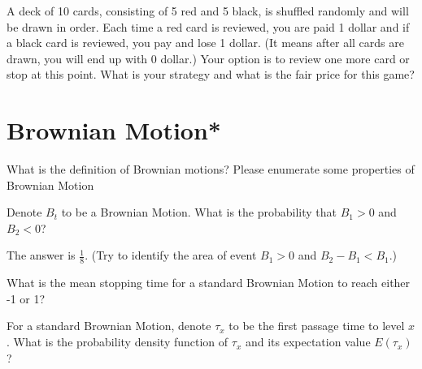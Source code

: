 \begin{exe}
A deck of 10 cards, consisting of 5 red and 5 black, is shuffled randomly and will be drawn in order. Each time a red card is reviewed, you are paid 1 dollar and if a black card is reviewed, you pay and lose 1 dollar. (It means after all cards are drawn, you will end up with 0 dollar.) Your option is to review one more card or stop at this point. What is your strategy and what is the fair price for this game?
\end{exe}
\begin{teacher}
\begin{sol}
\end{sol}
\end{teacher}





\section{Brownian Motion*}
\begin{exe}
What is the definition of Brownian motions? Please enumerate some properties of Brownian Motion
\end{exe}
\begin{teacher}
\begin{sol}
\end{sol}
\end{teacher}

\begin{exe}
Denote $B_t$ to be a Brownian Motion. What is the probability that $B_1>0$ and $B_2<0$?
\end{exe}
\begin{teacher}
\begin{sol}
The answer is $\frac{1}{8}$. (Try to identify the area of event $B_1>0$ and $B_2-B_1<B_1$.)
\end{sol}
\end{teacher}

\begin{exe}
What is the mean stopping time for a standard Brownian Motion to reach either -1 or 1?
\end{exe}
\begin{teacher}
\begin{sol}
\end{sol}
\end{teacher}

\begin{exe}
For a standard Brownian Motion, denote $\tau_x$ to be the first passage time to level $x$. What is the probability density function of $\tau_x$ and its expectation value $E(\tau_x)$?
\end{exe}
\begin{teacher}
\begin{sol}
\end{sol}
\end{teacher}


